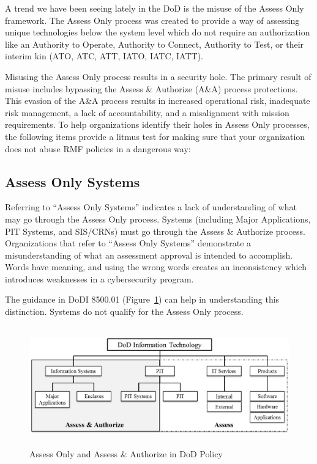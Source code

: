 A trend we have been seeing lately in the DoD is the misuse of the Assess Only framework. The Assess Only process was created to provide a way of assessing unique technologies below the system level which do not require an authorization like an Authority to Operate, Authority to Connect, Authority to Test, or their interim kin (ATO, ATC, ATT, IATO, IATC, IATT).\autocite[\pno~13]{20240212:dodi851001}

Misusing the Assess Only process results in a security hole. The primary result of misuse includes bypassing the Assess \& Authorize (A\&A) process protections. This evasion of the A\&A process results in increased operational risk, inadequate risk management, a lack of accountability, and a misalignment with mission requirements. To help organizations identify their holes in Assess Only processes, the following items provide a litmus test for making sure that your organization does not abuse RMF policies in a dangerous way:

\subsection{Assess Only Systems}
Referring to ``Assess Only Systems'' indicates a lack of understanding of what may go through the Assess Only process. Systems (including Major Applications, PIT Systems, and SIS/CRNs) must go through the Assess \& Authorize process. Organizations that refer to ``Assess Only Systems'' demonstrate a misunderstanding of what an assessment approval is intended to accomplish. Words have meaning, and using the wrong words creates an inconsistency which introduces weaknesses in a cybersecurity program.

The guidance in DoDI 8500.01 (Figure~\ref{fig:20240212:dodit}) can help in understanding this distinction.\autocite{20240212:dodi850001} Systems do not qualify for the Assess Only process.

\begin{figure}[h]
\centering
\includegraphics[width=14cm, height=5.144cm]{20240212.dodit.png}
\caption{Assess Only and Assess \& Authorize in DoD Policy}
\label{fig:20240212:dodit}
\end{figure}

